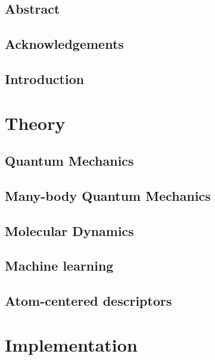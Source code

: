\documentclass[12pt]{report}
\begin{document}


\chapter*{Abstract}


\chapter*{Acknowledgements}


\tableofcontents

\chapter{Introduction}


\part{Theory}

\chapter{Quantum Mechanics}


\chapter{Many-body Quantum Mechanics}


\chapter{Molecular Dynamics}


\chapter{Machine learning}


\chapter{Atom-centered descriptors}\label{chap:acd}


\part{Implementation}
\end{document}
